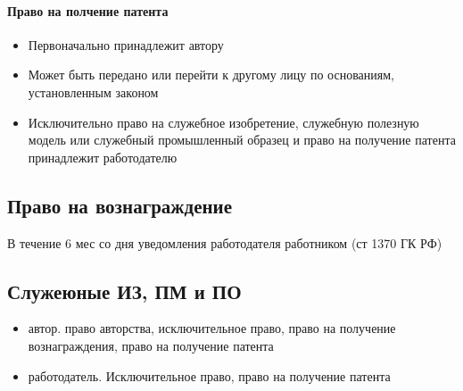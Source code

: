 \documentclass[12pt]{article}
\begin{document}
\hypertarget{ux43fux440ux430ux432ux43e-ux43dux430-ux43fux43eux43bux447ux435ux43dux438ux435-ux43fux430ux442ux435ux43dux442ux430}{%
\paragraph{Право на полчение
патента}\label{ux43fux440ux430ux432ux43e-ux43dux430-ux43fux43eux43bux447ux435ux43dux438ux435-ux43fux430ux442ux435ux43dux442ux430}}

\begin{itemize}
\item
  Первоначально принадлежит автору
\item
  Может быть передано или перейти к другому лицу по основаниям,
  установленным законом
\item
  Исключительно право на служебное изобретение, служебную полезную
  модель или служебный промышленный образец и право на получение патента
  принадлежит работодателю
\end{itemize}
\subsection{Право на вознаграждение} В течение 6
  мес со дня уведомления работодателя работником (ст 1370 ГК РФ)
  \subsection{Служеюные ИЗ, ПМ и ПО}

\begin{itemize}
\item
  автор. право авторства, исключительное право, право на получение
  вознаграждения, право на получение патента
\item
  работодатель. Исключительное право, право на получение патента
\end{itemize}
\end{document}
